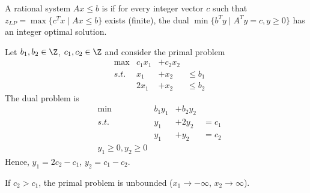 \begin{defn}\label{def23.4}
A rational system $A x \leq b$ is  if for every integer vector $c$ such that $z_{LP} = \max \{ c^Tx \mid Ax
\leq b\}$ exists (finite), the dual $\min \{ b^Ty \mid A^Ty=c, y \geq 0\}$
has an integer optimal solution.
\end{defn}

\begin{xmp+}
Let $b_1, b_2 \in \Z$, $c_1, c_2 \in \Z$ and consider the primal problem
\begin{align*}
&\max & c_1 x_1 &+ c_2 x_2 \\
&s.t. & x_1 &+ x_2 & \leq b_1 \\
&& 2 x_1 &+ x_2 &\leq b_2
\end{align*}
The dual problem is
\begin{align*}
&\min & b_1 y_1 &+ b_2 y_2 \\
&s.t. & y_1 &+ 2y_2 & = c_1 \\
&& y_1 &+ y_2 & = c_2 \\
& y_1 \geq 0, y_2 \geq 0
\end{align*}
Hence, $y_1 = 2 c_2 - c_1$, $y_2 = c_1 - c_2$.

If $c_2 > c_1$, the primal problem is unbounded ($x_1 \rightarrow -\infty$,
$x_2 \rightarrow \infty$).
\end{xmp+}